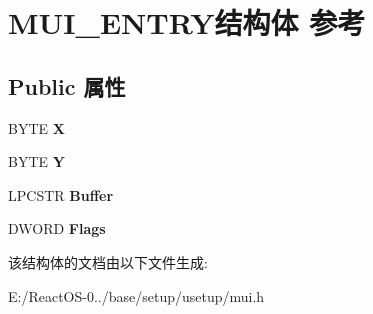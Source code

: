 \hypertarget{struct_m_u_i___e_n_t_r_y}{}\section{M\+U\+I\+\_\+\+E\+N\+T\+R\+Y结构体 参考}
\label{struct_m_u_i___e_n_t_r_y}
\subsection*{Public 属性}
\begin{DoxyCompactItemize}
\item 
\mbox{\label{struct_m_u_i___e_n_t_r_y_a3194682944cac6bd6693ac154a7a6062}} 
B\+Y\+TE {\bfseries X}
\item 
\mbox{\label{struct_m_u_i___e_n_t_r_y_a037f1501ce41427763b48e039b92bc8d}} 
B\+Y\+TE {\bfseries Y}
\item 
\mbox{\label{struct_m_u_i___e_n_t_r_y_a3fc05fc570afce9d4329dda5f6ef05f6}} 
L\+P\+C\+S\+TR {\bfseries Buffer}
\item 
\mbox{\label{struct_m_u_i___e_n_t_r_y_ae73ca1ffc6fabd1d62e799292fd16f9a}} 
D\+W\+O\+RD {\bfseries Flags}
\end{DoxyCompactItemize}


该结构体的文档由以下文件生成\+:\begin{DoxyCompactItemize}
\item 
E\+:/\+React\+O\+S-\/0../base/setup/usetup/mui.\+h\end{DoxyCompactItemize}
